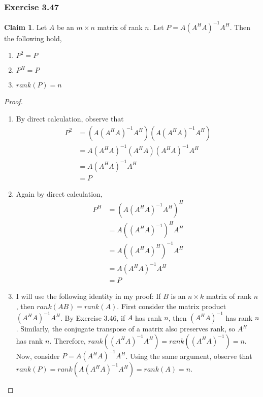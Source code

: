 \documentclass[letterpaper,12pt]{article}
\theoremstyle{definition}
\newtheorem{claim}[theorem]{Claim}
\begin{document}
\subsubsection*{Exercise 3.47}
\begin{claim}
	Let $A$ be an $m\times n$ matrix of rank $n$. Let $P = A (A^HA)^{-1}A^H$. Then the following hold,
	\begin{enumerate}
	\item $P^2 = P$ 
	\item $P^H = P$ 
	\item $rank(P) = n$
	\end{enumerate}
\end{claim}

\begin{proof}
\begin{enumerate}
	\item By direct calculation, observe that 
	\begin{align*}
	P^2 &= (A (A^HA)^{-1}A^H)(A (A^HA)^{-1}A^H) \\
	&= A (A^HA)^{-1}(A^HA) (A^HA)^{-1}A^H \\
	&= A (A^HA)^{-1}A^H \\
	&= P
	\end{align*}
	\item Again by direct calculation,
	\begin{align*}
	P^H &= (A (A^HA)^{-1}A^H)^H \\
	&= A ((A^HA)^{-1})^H A^H \\
	&=  A ((A^HA)^{H})^{-1} A^H \\
	&= A (A^HA)^{-1}A^H \\
	&= P
	\end{align*}
	\item I will use the following identity in my proof: If $B$ is an $n\times k$ matrix of rank $n$, then $rank(AB) = rank(A)$. First consider the matrix product $(A^HA)^{-1}A^H$. By Exercise 3.46, if $A$ has rank $n$, then $(A^HA)^{-1}$ has rank $n$. Similarly, the conjugate transpose of a matrix also preserves rank, so $A^H$ has rank $n$. Therefore, $rank((A^HA)^{-1}A^H) = rank((A^HA)^{-1}) = n$. Now, consider $P = A(A^HA)^{-1}A^H$. Using the same argument, observe that $rank(P) = rank(A(A^HA)^{-1}A^H) = rank(A) = n$. 
\end{enumerate}
\end{proof}
\end{document}
